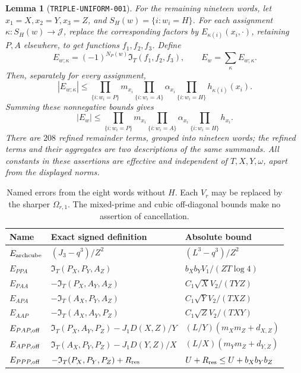 \documentclass[11pt]{article}
\newtheorem{lemma}{Lemma}
\newcommand{\IT}{\mathfrak I_T}
\begin{document}
\begin{lemma}[\texttt{TRIPLE-UNIFORM-001}]
For the remaining nineteen words, let \(x_1=X,x_2=Y,x_3=Z\), and
\(S_H(w)=\{i:w_i=H\}\). For each assignment
\(\kappa:S_H(w)\to\mathcal J\), replace the corresponding factors by
\(E_{\kappa(i)}(x_i,\cdot)\), retaining \(P,A\) elsewhere, to get
functions \(f_1,f_2,f_3\). Define
\begin{equation}\label{eq:uniform-refinement}
 E_{w;\kappa}=(-1)^{N_P(w)}\IT(f_1,f_2,f_3),\qquad
 E_w=\sum_\kappa E_{w;\kappa}.
\end{equation}
Then, separately for every assignment,
\begin{equation}\label{eq:uniform-component-bound}
 |E_{w;\kappa}|\leq
 \prod_{\{i:w_i=P\}}m_{x_i}
 \prod_{\{i:w_i=A\}}\alpha_{x_i}
 \prod_{\{i:w_i=H\}}h_{\kappa(i)}(x_i).
\end{equation}
Summing these nonnegative bounds gives
\begin{equation}\label{eq:uniform-word-bound}
 |E_w|\leq
 \prod_{\{i:w_i=P\}}m_{x_i}
 \prod_{\{i:w_i=A\}}\alpha_{x_i}
 \prod_{\{i:w_i=H\}}h_{x_i}.
\end{equation}
There are \(208\) refined remainder terms, grouped into nineteen words;
the refined terms and their aggregates are two descriptions of the same
summands. All constants in these assertions are effective and independent
of \(T,X,Y,\omega\), apart from the displayed norms.
\end{lemma}

\begin{table}[p]
\centering\small
\begin{tabular}{p{}p{}p{}}
\toprule
Name & Exact signed definition & Absolute bound\\
\midrule
\(E_{\rm archcube}\) &
 \((J_3-q^3)/Z^2\) &
 \((L^3-q^3)/Z^2\)\\[5pt]
\(E_{PPA}\) & \(\IT(P_X,P_Y,A_Z)\) &
 \(b_Xb_Y V_1/(ZT\log4)\)\\[5pt]
\(E_{PAA}\) & \(-\IT(P_X,A_Y,A_Z)\) &
 \(C_1\sqrt{X}V_2/(TYZ)\)\\[5pt]
\(E_{APA}\) & \(-\IT(A_X,P_Y,A_Z)\) &
 \(C_1\sqrt{Y}V_2/(TXZ)\)\\[5pt]
\(E_{AAP}\) & \(-\IT(A_X,A_Y,P_Z)\) &
 \(C_1\sqrt{Z}V_2/(TXY)\)\\[5pt]
\(E_{PAP,{\rm off}}\) &
 \(\IT(P_X,A_Y,P_Z)-J_1D(X,Z)/Y\) &
 \((L/Y)(m_Xm_Z+d_{X,Z})\)\\[5pt]
\(E_{APP,{\rm off}}\) &
 \(\IT(A_X,P_Y,P_Z)-J_1D(Y,Z)/X\) &
 \((L/X)(m_Ym_Z+d_{Y,Z})\)\\[5pt]
\(E_{PPP,{\rm off}}\) &
 \(-\IT(P_X,P_Y,P_Z)+R_{\rm res}\) &
 \(U+R_{\rm res}\leq U+b_Xb_Yb_Z\)\\
\bottomrule
\end{tabular}
\caption{Named errors from the eight words without \(H\).
Each \(V_r\) may be replaced by the sharper \(\Omega_{r,1}\).
The mixed-prime and cubic off-diagonal bounds make no assertion of
cancellation.}\label{tab:uniform-eight}
\end{table}
\end{document}
